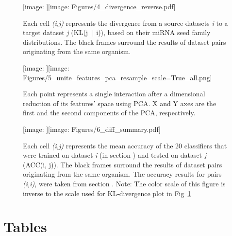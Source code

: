 \documentclass{bmcart}
\def\texttt{[image: ]}
\begin{document}
\begin{backmatter}
\begin{figure}[h!]
  \caption{}
      \texttt{[image: Figures/4\_divergence\_reverse.pdf]}
      \label{fig:divergence}
      \caption*{Each cell \textit{(i,j)} represents the divergence from  a source datasets \textit{i} to a target dataset \textit{j} (KL(j $||$ i)), based on their miRNA seed family distributions. The black frames surround the results of dataset pairs originating from the same organism.}
      \end{figure}


\begin{figure}[h!]
  \caption{} 
       \texttt{[image: Figures/5\_unite\_features\_pca\_resample\_scale=True\_all.png]}
      \label{fig:feature_pca}
      \caption*{Each point represents a single interaction after a dimensional reduction of its features' space using PCA. X and Y axes are the first and the second components of the PCA, respectively.}
      \end{figure}




\begin{figure}[h!]
  \caption{}
      \texttt{[image: Figures/6\_diff\_summary.pdf]}
    \label{fig:crossdataset}
    \caption*{Each cell \textit{(i,j)} represents the mean accuracy of the 20 classifiers that were trained on dataset \textit{i} (in section ) and tested on dataset \textit{j} (ACC(i, j)). The black frames surround the results of dataset pairs originating from the same organism. The accuracy results for pairs \textit{(i,i)}, were taken from section . Note: The color scale of this figure is inverse to the scale used for KL-divergence plot in Fig~\ref{fig:divergence}}
      \end{figure}




\clearpage
\section*{Tables}



\end{backmatter}
\end{document}
